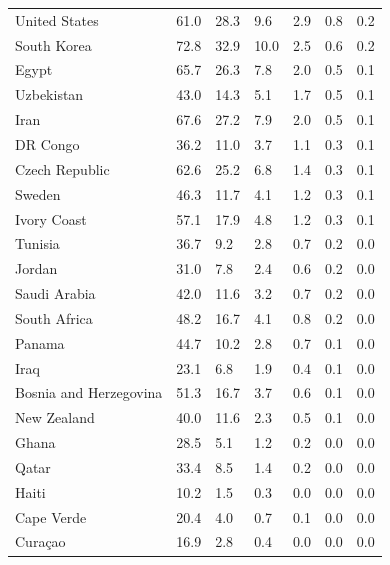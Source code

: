 \begin{tabular}{lllllll}
United States & 61.0 & 28.3 & 9.6 & 2.9 & 0.8 & 0.2 \\
South Korea & 72.8 & 32.9 & 10.0 & 2.5 & 0.6 & 0.2 \\
Egypt & 65.7 & 26.3 & 7.8 & 2.0 & 0.5 & 0.1 \\
Uzbekistan & 43.0 & 14.3 & 5.1 & 1.7 & 0.5 & 0.1 \\
Iran & 67.6 & 27.2 & 7.9 & 2.0 & 0.5 & 0.1 \\
DR Congo & 36.2 & 11.0 & 3.7 & 1.1 & 0.3 & 0.1 \\
Czech Republic & 62.6 & 25.2 & 6.8 & 1.4 & 0.3 & 0.1 \\
Sweden & 46.3 & 11.7 & 4.1 & 1.2 & 0.3 & 0.1 \\
Ivory Coast & 57.1 & 17.9 & 4.8 & 1.2 & 0.3 & 0.1 \\
Tunisia & 36.7 & 9.2 & 2.8 & 0.7 & 0.2 & 0.0 \\
Jordan & 31.0 & 7.8 & 2.4 & 0.6 & 0.2 & 0.0 \\
Saudi Arabia & 42.0 & 11.6 & 3.2 & 0.7 & 0.2 & 0.0 \\
South Africa & 48.2 & 16.7 & 4.1 & 0.8 & 0.2 & 0.0 \\
Panama & 44.7 & 10.2 & 2.8 & 0.7 & 0.1 & 0.0 \\
Iraq & 23.1 & 6.8 & 1.9 & 0.4 & 0.1 & 0.0 \\
Bosnia and Herzegovina & 51.3 & 16.7 & 3.7 & 0.6 & 0.1 & 0.0 \\
New Zealand & 40.0 & 11.6 & 2.3 & 0.5 & 0.1 & 0.0 \\
Ghana & 28.5 & 5.1 & 1.2 & 0.2 & 0.0 & 0.0 \\
Qatar & 33.4 & 8.5 & 1.4 & 0.2 & 0.0 & 0.0 \\
Haiti & 10.2 & 1.5 & 0.3 & 0.0 & 0.0 & 0.0 \\
Cape Verde & 20.4 & 4.0 & 0.7 & 0.1 & 0.0 & 0.0 \\
Curaçao & 16.9 & 2.8 & 0.4 & 0.0 & 0.0 & 0.0 \\
\bottomrule
\end{tabular}

